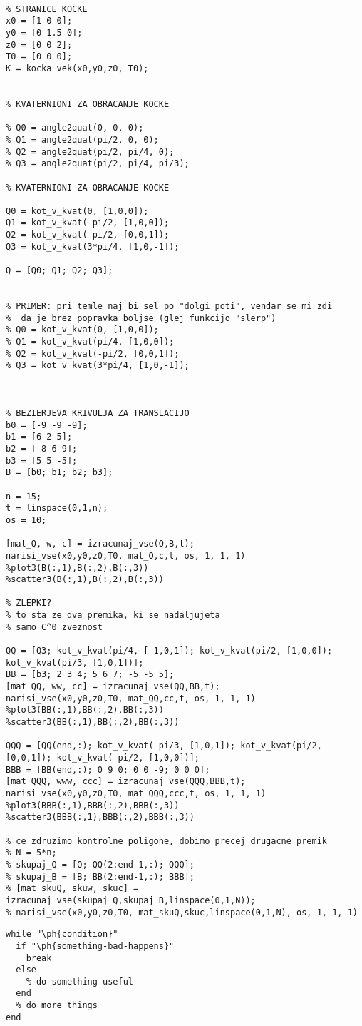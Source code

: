 \documentclass[12pt,a4paper,twoside]{article}
\let\ph\mlplaceholder %
\theoremstyle{definition} %
\theoremstyle{plain} %
\numberwithin{equation}{section}  %
\begin{document}
\begin{lstlisting}[caption = {\color{green} main}]
% definicija kocke

% STRANICE KOCKE
x0 = [1 0 0];
y0 = [0 1.5 0];
z0 = [0 0 2];
T0 = [0 0 0];
K = kocka_vek(x0,y0,z0, T0);


% KVATERNIONI ZA OBRACANJE KOCKE

% Q0 = angle2quat(0, 0, 0);
% Q1 = angle2quat(pi/2, 0, 0);
% Q2 = angle2quat(pi/2, pi/4, 0);
% Q3 = angle2quat(pi/2, pi/4, pi/3);

% KVATERNIONI ZA OBRACANJE KOCKE

Q0 = kot_v_kvat(0, [1,0,0]);
Q1 = kot_v_kvat(-pi/2, [1,0,0]);
Q2 = kot_v_kvat(-pi/2, [0,0,1]);
Q3 = kot_v_kvat(3*pi/4, [1,0,-1]);

Q = [Q0; Q1; Q2; Q3];


% PRIMER: pri temle naj bi sel po "dolgi poti", vendar se mi zdi
%  da je brez popravka boljse (glej funkcijo "slerp")
% Q0 = kot_v_kvat(0, [1,0,0]);
% Q1 = kot_v_kvat(pi/4, [1,0,0]);
% Q2 = kot_v_kvat(-pi/2, [0,0,1]);
% Q3 = kot_v_kvat(3*pi/4, [1,0,-1]);



% BEZIERJEVA KRIVULJA ZA TRANSLACIJO
b0 = [-9 -9 -9];
b1 = [6 2 5];
b2 = [-8 6 9];
b3 = [5 5 -5];
B = [b0; b1; b2; b3];

n = 15;
t = linspace(0,1,n);
os = 10;

[mat_Q, w, c] = izracunaj_vse(Q,B,t);
narisi_vse(x0,y0,z0,T0, mat_Q,c,t, os, 1, 1, 1)
%plot3(B(:,1),B(:,2),B(:,3))
%scatter3(B(:,1),B(:,2),B(:,3))

% ZLEPKI?
% to sta ze dva premika, ki se nadaljujeta 
% samo C^0 zveznost

QQ = [Q3; kot_v_kvat(pi/4, [-1,0,1]); kot_v_kvat(pi/2, [1,0,0]); kot_v_kvat(pi/3, [1,0,1])]; 
BB = [b3; 2 3 4; 5 6 7; -5 -5 5];
[mat_QQ, ww, cc] = izracunaj_vse(QQ,BB,t);
narisi_vse(x0,y0,z0,T0, mat_QQ,cc,t, os, 1, 1, 1)
%plot3(BB(:,1),BB(:,2),BB(:,3))
%scatter3(BB(:,1),BB(:,2),BB(:,3))

QQQ = [QQ(end,:); kot_v_kvat(-pi/3, [1,0,1]); kot_v_kvat(pi/2, [0,0,1]); kot_v_kvat(-pi/2, [1,0,0])]; 
BBB = [BB(end,:); 0 9 0; 0 0 -9; 0 0 0];
[mat_QQQ, www, ccc] = izracunaj_vse(QQQ,BBB,t);
narisi_vse(x0,y0,z0,T0, mat_QQQ,ccc,t, os, 1, 1, 1)
%plot3(BBB(:,1),BBB(:,2),BBB(:,3))
%scatter3(BBB(:,1),BBB(:,2),BBB(:,3))

% ce zdruzimo kontrolne poligone, dobimo precej drugacne premik
% N = 5*n;
% skupaj_Q = [Q; QQ(2:end-1,:); QQQ];
% skupaj_B = [B; BB(2:end-1,:); BBB];
% [mat_skuQ, skuw, skuc] = izracunaj_vse(skupaj_Q,skupaj_B,linspace(0,1,N));
% narisi_vse(x0,y0,z0,T0, mat_skuQ,skuc,linspace(0,1,N), os, 1, 1, 1)
\end{lstlisting}


\begin{lstlisting}[caption = {For educational purposes}]
% example of while loop using placeholders
while "\ph{condition}"
  if "\ph{something-bad-happens}"
    break
  else
    % do something useful
  end
  % do more things
end
\end{lstlisting}
\end{document}
